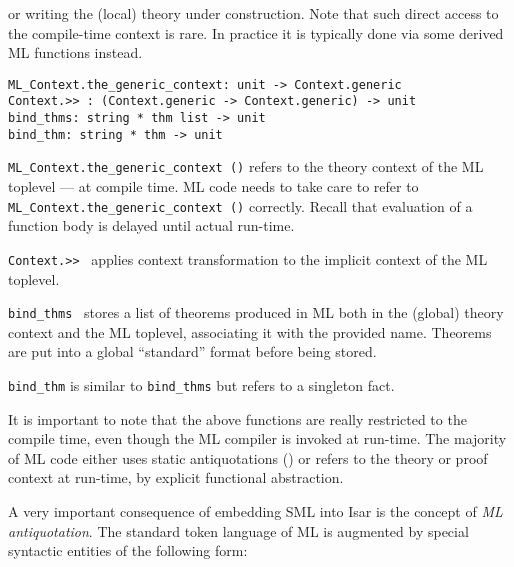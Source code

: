 \begin{isabellebody}
\begin{isamarkuptext}
  or writing the (local) theory under construction.  Note that such
  direct access to the compile-time context is rare.  In practice it
  is typically done via some derived ML functions instead.%
\end{isamarkuptext}%
\isamarkuptrue%
%
\isadelimmlref
%
\endisadelimmlref
%
\isatagmlref
%
\begin{isamarkuptext}%
\begin{mldecls}
  \verb|ML_Context.the_generic_context: unit -> Context.generic| \\
  \verb|Context.>> : (Context.generic -> Context.generic) -> unit| \\
  \verb|bind_thms: string * thm list -> unit| \\
  \verb|bind_thm: string * thm -> unit| \\
  \end{mldecls}

  \begin{description}

  \item \verb|ML_Context.the_generic_context ()| refers to the theory
  context of the ML toplevel --- at compile time.  ML code needs to
  take care to refer to \verb|ML_Context.the_generic_context ()|
  correctly.  Recall that evaluation of a function body is delayed
  until actual run-time.

  \item \verb|Context.>>|~ applies context transformation
   to the implicit context of the ML toplevel.

  \item \verb|bind_thms|~ stores a list of
  theorems produced in ML both in the (global) theory context and the
  ML toplevel, associating it with the provided name.  Theorems are
  put into a global ``standard'' format before being stored.

  \item \verb|bind_thm| is similar to \verb|bind_thms| but refers to a
  singleton fact.

  \end{description}

  It is important to note that the above functions are really
  restricted to the compile time, even though the ML compiler is
  invoked at run-time.  The majority of ML code either uses static
  antiquotations () or refers to the theory or
  proof context at run-time, by explicit functional abstraction.%
\end{isamarkuptext}%
\isamarkuptrue%
%
\endisatagmlref
{\isafoldmlref}%
%
\isadelimmlref
%
\endisadelimmlref
%
\isamarkuptrue%
%
\begin{isamarkuptext}%
A very important consequence of embedding SML into Isar is the
  concept of \emph{ML antiquotation}.  The standard token language of
  ML is augmented by special syntactic entities of the following form:


\end{isamarkuptext}
\end{isabellebody}
